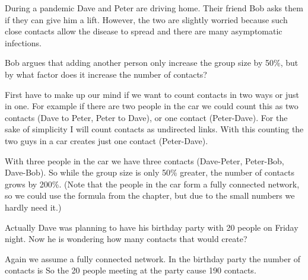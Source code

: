 

During a pandemic Dave and Peter are driving home. Their friend Bob asks them if they can give him a lift. However, the two are slightly worried because such close contacts allow the disease to spread and there are many asymptomatic infections. 

\subquestion
Bob argues that adding another person only increase the group size by 50\%, but by what factor does it increase the number of contacts?

\solution
First have to make up our mind if we want to count contacts in two ways or just in one. For example if there are two people in the car we could count this as two contacts (Dave to Peter, Peter to Dave), or one contact (Peter-Dave). For the sake of simplicity I will count contacts as undirected links. With this counting the two guys in a car creates just one contact (Peter-Dave).

With three people in the car we have three contacts (Dave-Peter, Peter-Bob, Dave-Bob). So while the group size is only 50\% greater, the number of contacts grows by 200\%. (Note that the people in the car form a fully connected network, so we could use the formula from the chapter, but due to the small numbers we hardly need it.)

\subquestion
Actually Dave was planning to have his birthday party with 20 people on Friday night. Now he is wondering how many contacts that would create?

\solution
Again we assume a fully connected network. In the birthday party the number of contacts is 
So the 20 people meeting at the party cause 190 contacts.

